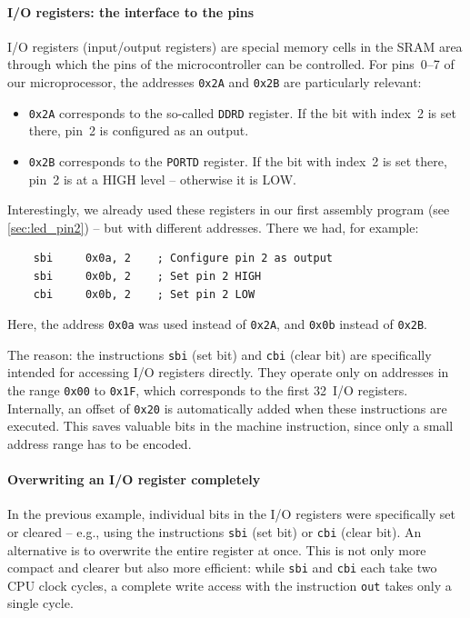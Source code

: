 \documentclass[a4paper,12pt]{article}
\begin{document}
\paragraph{I/O registers: the interface to the pins}

I/O registers (input/output registers) are special memory cells in the SRAM
area through which the pins of the microcontroller can be controlled. For
pins~0–7 of our microprocessor, the addresses \texttt{0x2A} and
\texttt{0x2B} are particularly relevant:

\begin{itemize}
    \item
	\texttt{0x2A} corresponds to the so-called \texttt{DDRD} register. If
	the bit with index~2 is set there, pin~2 is configured as an output.
\newpage
    \item
	\texttt{0x2B} corresponds to the \texttt{PORTD} register. If the bit
	with index~2 is set there, pin~2 is at a HIGH level – otherwise it is
	LOW.
\end{itemize}

\noindent
Interestingly, we already used these registers in our first assembly program
(see \autoref{sec:led_pin2}) – but with different addresses. There we had,
for example:

\begin{lstlisting}
    sbi     0x0a, 2    ; Configure pin 2 as output
    sbi     0x0b, 2    ; Set pin 2 HIGH
    cbi     0x0b, 2    ; Set pin 2 LOW
\end{lstlisting}

\noindent
Here, the address \texttt{0x0a} was used instead of \texttt{0x2A}, and
\texttt{0x0b} instead of \texttt{0x2B}.

\noindent
The reason: the instructions \texttt{sbi} (set bit) and \texttt{cbi} (clear
bit) are specifically intended for accessing I/O registers directly. They
operate only on addresses in the range \texttt{0x00} to \texttt{0x1F}, which
corresponds to the first 32~I/O registers. Internally, an offset of
\texttt{0x20} is automatically added when these instructions are executed.
This saves valuable bits in the machine instruction, since only a small
address range has to be encoded.



\paragraph{Overwriting an I/O register completely}

In the previous example, individual bits in the I/O registers were
specifically set or cleared – e.g., using the instructions \texttt{sbi} (set
bit) or \texttt{cbi} (clear bit). An alternative is to overwrite the entire
register at once. This is not only more compact and clearer but also more
efficient: while \texttt{sbi} and \texttt{cbi} each take two CPU clock
cycles, a complete write access with the instruction \texttt{out} takes only
a single cycle.
\end{document}
